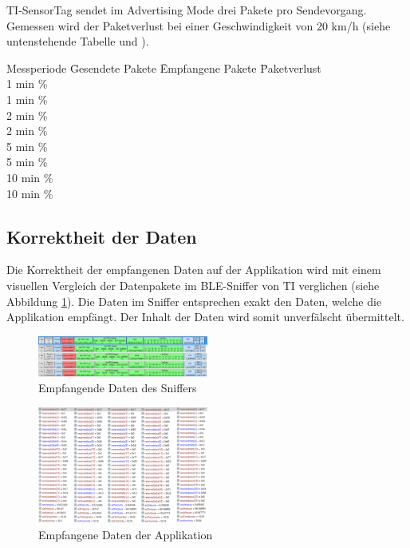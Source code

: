 TI-SensorTag sendet im Advertising Mode drei Pakete pro Sendevorgang. Gemessen wird der Paketverlust bei einer Geschwindigkeit von 20 km/h (siehe untenstehende Tabelle und ).   

\begin{minipage}{\textwidth}
    \begin{tabbing}
    Messperiode \quad\= Gesendete Pakete \quad\= Empfangene Pakete \quad\= Paketverlust\\[0.8ex]
    1 min      \thinspace\%  \\
    1 min      \thinspace\%  \\
    2 min      \thinspace\%  \\
    2 min      \thinspace\%  \\
    5 min      \thinspace\%  \\
    5 min      \thinspace\%  \\
    10 min      \thinspace\%  \\
    10 min      \thinspace\%
    \end{tabbing}
\end{minipage}

\subsection{Korrektheit der Daten}

Die Korrektheit der empfangenen Daten auf der Applikation wird mit einem visuellen Vergleich der Datenpakete im BLE-Sniffer von TI verglichen (siehe Abbildung \ref{sniffer}).  Die Daten im Sniffer entsprechen exakt den Daten, welche die Applikation empfängt. Der Inhalt der Daten wird somit unverfälscht übermittelt.



\begin{figure}[ht]
    \includegraphics[width=0.5\textwidth]{4Resultate/imag/sniffer.png} 
    \caption{Empfangende Daten des Sniffers}
    \label{sniffer}
\end{figure}

\begin{figure}[ht]
    \includegraphics[width=0.5\textwidth]{4Resultate/imag/app_alle.png} 
    \caption{Empfangene Daten der Applikation}
    \label{applikation_daten}
\end{figure}









